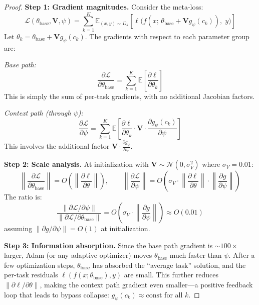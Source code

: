 \documentclass[10pt,a4paper]{amsart}
\begin{document}
\begin{proof}
\textbf{Step 1: Gradient magnitudes.}
Consider the meta-loss:
\begin{equation}
    \mathcal{L}(\theta_\mathrm{base}, \mathbf{V}, \psi) = \sum_{k=1}^K \mathbb{E}_{(x,y) \sim D_k}\left[\ell\bigl(f(x;\, \theta_\mathrm{base} + \mathbf{V} g_\psi(c_k)),\; y\bigr)\right]
\end{equation}
Let $\theta_k = \theta_\mathrm{base} + \mathbf{V} g_\psi(c_k)$. The gradients with respect to each parameter group are:

\emph{Base path:}
\begin{equation}
    \frac{\partial \mathcal{L}}{\partial \theta_\mathrm{base}} = \sum_{k=1}^K \mathbb{E}\left[\frac{\partial \ell}{\partial \theta_k}\right]
\end{equation}
This is simply the sum of per-task gradients, with no additional Jacobian factors.

\emph{Context path (through $\psi$):}
\begin{equation}
    \frac{\partial \mathcal{L}}{\partial \psi} = \sum_{k=1}^K \mathbb{E}\left[\frac{\partial \ell}{\partial \theta_k} \cdot \mathbf{V} \cdot \frac{\partial g_\psi(c_k)}{\partial \psi}\right]
\end{equation}
This involves the additional factor $\mathbf{V} \cdot \frac{\partial g_\psi}{\partial \psi}$.

\textbf{Step 2: Scale analysis.}
At initialization with $\mathbf{V} \sim \mathcal{N}(0, \sigma_V^2)$ where $\sigma_V = 0.01$:
\begin{equation}
    \left\|\frac{\partial \mathcal{L}}{\partial \theta_\mathrm{base}}\right\| = O\left(\left\|\frac{\partial \ell}{\partial \theta}\right\|\right), \qquad
    \left\|\frac{\partial \mathcal{L}}{\partial \psi}\right\| = O\left(\sigma_V \cdot \left\|\frac{\partial \ell}{\partial \theta}\right\| \cdot \left\|\frac{\partial g}{\partial \psi}\right\|\right)
\end{equation}
The ratio is:
\begin{equation}
    \frac{\|\partial \mathcal{L} / \partial \psi\|}{\|\partial \mathcal{L} / \partial \theta_\mathrm{base}\|} = O\left(\sigma_V \cdot \left\|\frac{\partial g}{\partial \psi}\right\|\right) \approx O(0.01)
\end{equation}
assuming $\|\partial g / \partial \psi\| = O(1)$ at initialization.

\textbf{Step 3: Information absorption.}
Since the base path gradient is $\sim 100\times$ larger, Adam (or any adaptive optimizer) moves $\theta_\mathrm{base}$ much faster than $\psi$. After a few optimization steps, $\theta_\mathrm{base}$ has absorbed the ``average task'' solution, and the per-task residuals $\ell(f(x; \theta_\mathrm{base}), y)$ are small. This further reduces $\|\partial \ell / \partial \theta\|$, making the context path gradient even smaller---a positive feedback loop that leads to bypass collapse: $g_\psi(c_k) \approx \mathrm{const}$ for all $k$.


\end{proof}
\end{document}
